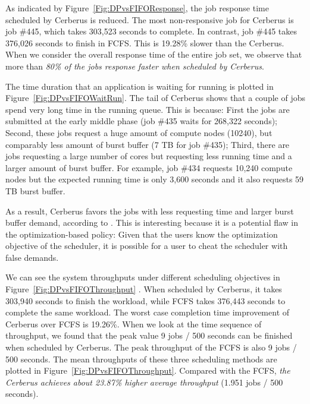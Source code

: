As indicated by Figure~\ref{Fig:DPvsFIFOResponse}, the job response time scheduled by Cerberus is reduced.
The most non-responsive job for Cerberus is job \#445, which takes 303,523 seconds to complete.
In contrast, job \#445 takes 376,026 seconds to finish in FCFS.
This is 19.28\% slower than the Cerberus.
When we consider the overall response time of the entire job set,
we observe that more than \textit{80\% of the jobs response faster when scheduled by Cerberus}.


The time duration that an application is waiting for running
is plotted in Figure~\ref{Fig:DPvsFIFOWaitRun}.
The tail of Cerberus shows that a couple of jobs
spend very long time in the running queue.
This is because: First the jobs are submitted at the early middle phase
(job \#435 waits for 268,322 seconds); Second, these jobs request a huge
amount of compute nodes (10240), but comparably less amount of burst buffer (7 TB for job \#435);
Third, there are jobs requesting a large number of cores but requesting
less running time and a larger amount of burst buffer.
For example, job \#434 requests 10,240 compute nodes but the expected running time
is only 3,600 seconds and it also requests 59 TB burst buffer.

As a result, Cerberus favors the jobs with less requesting time and larger burst buffer demand,
according to .
This is interesting because it is a potential flaw in the optimization-based policy:
Given that the users know the optimization objective of the scheduler,
it is possible for a user to cheat the scheduler with false demands.


We can see the system throughputs under different scheduling objectives in Figure~\ref{Fig:DPvsFIFOThroughput} .
When scheduled by Cerberus, it takes 303,940 seconds to finish the workload,
while FCFS takes 376,443 seconds to complete the same workload.
The worst case completion time improvement of Cerberus over FCFS is 19.26\%.
When we look at the time sequence of throughput,
we found that the peak value 9 jobs / 500 seconds can be finished when scheduled by Cerberus.
The peak throughput of the FCFS is also 9 jobs / 500 seconds.
The mean throughputs of these three scheduling methods are plotted in Figure~\ref{Fig:DPvsFIFOThroughput}.
Compared with the FCFS, \textit{the Cerberus achieves about 23.87\% higher average throughput}
(1.951 jobs / 500 seconds).


